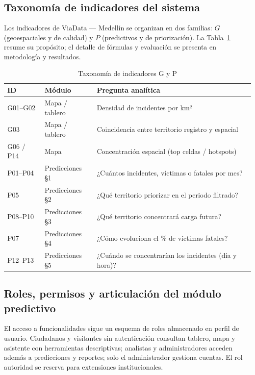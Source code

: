 \subsection{Taxonomía de indicadores del sistema}
Los indicadores de ViaData — Medellín se organizan en dos familias: $G$ (geoespaciales y de calidad) y $P$ (predictivos y de priorización). La Tabla~\ref{tab:taxonomia-indicadores} resume su propósito; el detalle de fórmulas y evaluación se presenta en metodología y resultados.

\begin{table}[H]
	\centering
	\caption{Taxonomía de indicadores G y P}
	\label{tab:taxonomia-indicadores}
	\small
	\begin{tabularx}{\linewidth}{@{}l l X@{}}
		\toprule
		\textbf{ID} & \textbf{Módulo} & \textbf{Pregunta analítica} \\
		\midrule
		G01--G02 & Mapa / tablero & Densidad de incidentes por km² \\
		G03 & Mapa / tablero & Coincidencia entre territorio registro y espacial \\
		G06 / P14 & Mapa & Concentración espacial (top celdas / hotspots) \\
		P01--P04 & Predicciones §1 & ¿Cuántos incidentes, víctimas o fatales por mes? \\
		P05 & Predicciones §2 & ¿Qué territorio priorizar en el periodo filtrado? \\
		P08--P10 & Predicciones §3 & ¿Qué territorio concentrará carga futura? \\
		P07 & Predicciones §4 & ¿Cómo evoluciona el \% de víctimas fatales? \\
		P12--P13 & Predicciones §5 & ¿Cuándo se concentrarían los incidentes (día y hora)? \\
		\bottomrule
	\end{tabularx}
\end{table}

\clearpage

\subsection{Roles, permisos y articulación del módulo predictivo}
El acceso a funcionalidades sigue un esquema de roles almacenado en perfil de usuario. Ciudadanos y visitantes sin autenticación consultan tablero, mapa y asistente con herramientas descriptivas; analistas y administradores acceden además a predicciones y reportes; solo el administrador gestiona cuentas. El rol autoridad se reserva para extensiones institucionales.


